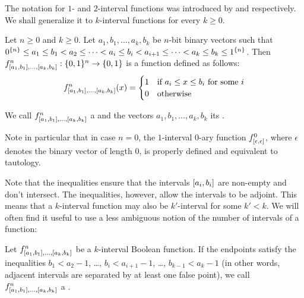 The notation for $1$- and $2$-interval
functions was introduced by \citeauthor{Schieber2005154}
and \citeauthor{Dubovsky2012} respectively.
We shall generalize it to $k$-interval functions
for every $k \geq 0$.

\begin{definition}
\label{def:kibf}
Let $n \geq 0$ and $k \geq 0$.
Let $a_1, b_1, \ldots, a_k, b_k$ be $n$-bit binary vectors
such that $0^{\{n\}} \leq a_1 \leq b_1 < a_2
\leq \cdots < a_i \leq b_i < a_{i+1}
\leq \cdots < a_k \leq b_k \leq 1^{\{n\}}$.
Then $f^{n}_{[a_1, b_1], \ldots, [a_{k}, b_{k}]}: \{0, 1\}{}^n \rightarrow \{0, 1\}{}$ is a function defined as follows:
$$
f^{n}_{[a_1, b_1], \ldots, [a_{k}, b_{k}]}(x) =
\begin{cases}
1 & \text{if } a_i \leq x \leq b_i \text{ for some } i \\
0 & \text{otherwise}
\end{cases}
$$

We call
$f^n_{[a_1, b_1], \ldots, [a_k, b_k]}$
a 
and the vectors $a_1, b_1, \ldots, a_k, b_k$ its
.
\end{definition}

Note in particular that in case $n=0$,
the $1$-interval $0$-ary function
$f^{0}_{[\epsilon, \epsilon]}$,
where $\epsilon$ denotes the binary vector of length $0$,
is properly defined and equivalent to tautology.

Note that the inequalities ensure
that the intervals $[a_i, b_i]$
are non-empty and don't intersect.
The inequalities, however, allow the intervals to be adjoint.
This means that a $k$-interval function may also be $k'$-interval for some $k' < k$.
We will often find it useful to use a less ambiguous notion of the number of intervals of a function:

\begin{definition}
\label{def:properkibf}
Let
$f^n_{[a_1, b_1], \ldots, [a_k, b_k]}$
be a $k$-interval Boolean function.
If the endpoints satisfy the inequalities
$b_1 < a_2 - 1$, \ldots, $b_i < a_{i+1} - 1$, \ldots,
$b_{k-1} < a_k - 1$
(in other words, adjacent intervals
are separated by at least one false point),
we call
$f^n_{[a_1, b_1], \ldots, [a_k, b_k]}$
a .
\end{definition}


